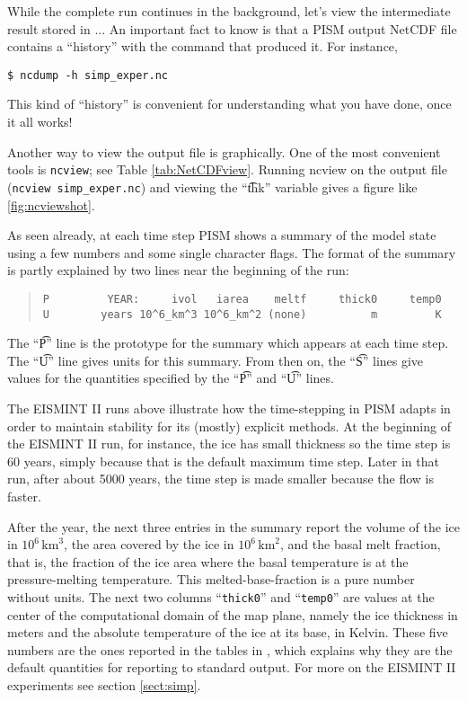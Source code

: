 While the complete run continues in the background, let's view the intermediate result stored in ...  An important fact to know is that a PISM output NetCDF file contains a ``history'' with the command that produced it.  For instance, 

\verb|$ ncdump -h simp_exper.nc|

\noindent This kind of ``history'' is convenient for understanding what you have done, once it all works!


Another way to view the output file is graphically.  One of the most convenient tools is \verb|ncview|; see Table \ref{tab:NetCDFview}.  Running ncview on the output file (\verb|ncview simp_exper.nc|) and viewing the ``\t{thk}'' variable gives a figure like \ref{fig:ncviewshot}.



As seen already, at each time step PISM shows a summary of the model state using a few numbers and some single character flags.  The format of the summary is partly explained by two lines near the beginning of the run:

\small\begin{quote}
\begin{verbatim}
P         YEAR:     ivol   iarea    meltf     thick0     temp0
U        years 10^6_km^3 10^6_km^2 (none)          m         K
\end{verbatim}
\end{quote}\normalsize

The ``\t{P}'' line is the prototype for the summary which appears at each time step.  The ``\t{U}'' line gives units for this summary.  From then on, the ``\t{S}'' lines give values for the quantities specified by the  ``\t{P}'' and ``\t{U}'' lines.

The EISMINT II runs above illustrate how the time-stepping in PISM adapts in order to maintain stability for its (mostly) explicit methods.  At the beginning of the EISMINT II run, for instance, the ice has small thickness so the time step is 60 years, simply because that is the default maximum time step.  Later in that run, after about 5000 years, the time step is made smaller because the flow is faster.

After the year, the next three entries in the summary report the volume of the ice in $10^6 \,\text{km}^3$, the area covered by the ice in $10^6\,\text{km}^2$, and the basal melt fraction, that is, the fraction of the ice area where the basal temperature is at the pressure-melting temperature.  This melted-base-fraction is a pure number without units.  The next two columns ``\texttt{thick0}'' and ``\texttt{temp0}'' are values at the center of the computational domain of the map plane, namely the ice thickness in meters and the absolute temperature of the ice at its base, in Kelvin.  These five numbers are the ones reported in the tables in \cite{EISMINT00}, which explains why they are the default quantities for reporting to standard output.  For more on the EISMINT II experiments see section \ref{sect:simp}.



